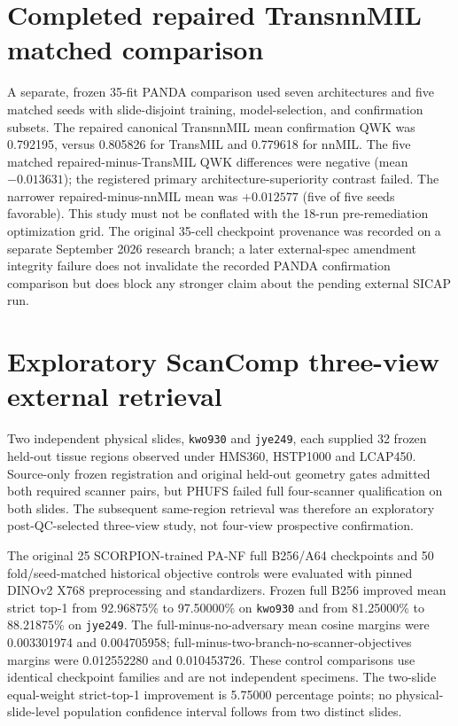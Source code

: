 \documentclass[10pt]{article}
\begin{document}
\section{Completed repaired TransnnMIL matched comparison}
A separate, frozen 35-fit PANDA comparison used seven architectures and five matched seeds with slide-disjoint training, model-selection, and confirmation subsets. The repaired canonical TransnnMIL mean confirmation QWK was 0.792195, versus 0.805826 for TransMIL and 0.779618 for nnMIL. The five matched repaired-minus-TransMIL QWK differences were negative (mean $-0.013631$); the registered primary architecture-superiority contrast failed. The narrower repaired-minus-nnMIL mean was $+0.012577$ (five of five seeds favorable). This study must not be conflated with the 18-run pre-remediation optimization grid. The original 35-cell checkpoint provenance was recorded on a separate September 2026 research branch; a later external-spec amendment integrity failure does not invalidate the recorded PANDA confirmation comparison but does block any stronger claim about the pending external SICAP run.

\section{Exploratory ScanComp three-view external retrieval}
Two independent physical slides, \texttt{kwo930} and \texttt{jye249}, each supplied 32 frozen held-out tissue regions observed under HMS360, HSTP1000 and LCAP450. Source-only frozen registration and original held-out geometry gates admitted both required scanner pairs, but PHUFS failed full four-scanner qualification on both slides. The subsequent same-region retrieval was therefore an exploratory post-QC-selected three-view study, not four-view prospective confirmation.

The original 25 SCORPION-trained PA-NF full B256/A64 checkpoints and 50 fold/seed-matched historical objective controls were evaluated with pinned DINOv2 X768 preprocessing and standardizers. Frozen full B256 improved mean strict top-1 from 92.96875\% to 97.50000\% on \texttt{kwo930} and from 81.25000\% to 88.21875\% on \texttt{jye249}. The full-minus-no-adversary mean cosine margins were 0.003301974 and 0.004705958; full-minus-two-branch-no-scanner-objectives margins were 0.012552280 and 0.010453726. These control comparisons use identical checkpoint families and are not independent specimens. The two-slide equal-weight strict-top-1 improvement is 5.75000 percentage points; no physical-slide-level population confidence interval follows from two distinct slides.
\end{document}
